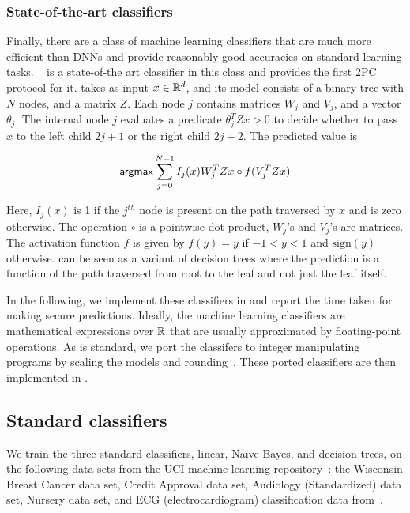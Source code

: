 \subsubsection*{State-of-the-art classifiers}
Finally, there are a class of machine learning classifiers that are
much more efficient than
DNNs and provide reasonably good accuracies on standard learning
tasks. \bonsai~\cite{bonsai} is a state-of-the art classifier in this
class and \tool provides the first 2PC protocol for it.
\bonsai takes as input $x \in {\mathbb{R}}^d$, and its model consists of a
binary tree with $N$ nodes, and a matrix $Z$. Each node $j$ contains
matrices $W_j$ and $V_j$, and a vector $\theta_{j}$. The internal node
$j$  evaluates a predicate $\theta_j^TZx > 0$ to decide whether
to pass $x$ to the left child $2j+1$ or the right child $2j+2$.
The predicted value is


\[
{\sf argmax} \sum_{j = 0}^{N - 1} I_j(x)W_j^TZx\circ f(V_j^TZx) 
\]

Here, $I_j(x)$ is 1 if the $j^{th}$ node is present on the path traversed by $x$
and is zero otherwise. 
The operation $\circ$ is a pointwise dot product, $W_j$'s and $V_j$'s
are matrices. The activation function $f$ is given by $f(y) = y$ if
$-1 < y < 1$ and $\mathrm{sign}(y)$ otherwise. \bonsai can be
seen as a variant of decision trees where the prediction is a function
of the path traversed from root to the leaf and not just the leaf
itself.

In the following, we implement these classifiers in \tool and report
the time taken for making secure predictions. Ideally, the machine
learning classifiers are mathematical expressions over ${\mathbb{R}}$ that are
usually approximated by floating-point operations. 
As is standard, we port the classifers to integer manipulating
programs by scaling the models and rounding~\cite{minionn}. These
ported classifiers are then implemented in \tool.

\subsection{Standard classifiers}
\label{sec:shallow}
We train the three standard classifiers, linear, Na\"{i}ve Bayes, and
decision trees, on the following data sets from the UCI
machine learning repository~\cite{uci}:
 the Wisconsin Breast Cancer data set, 
Credit Approval data set, Audiology (Standardized) data set, Nursery
data set, and ECG (electrocardiogram) classification data
from~\cite{barni}.

